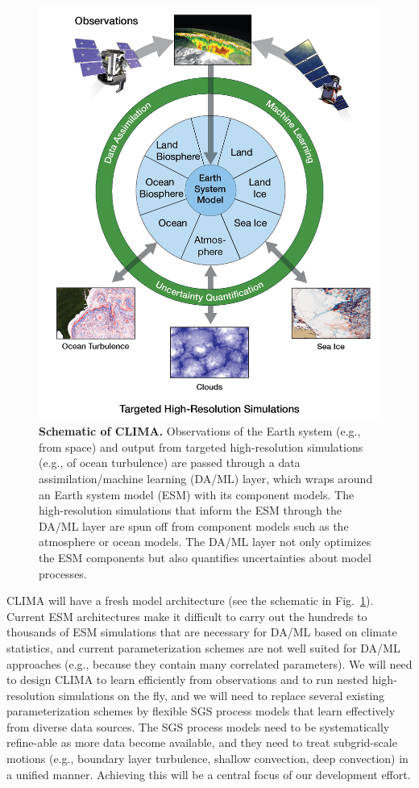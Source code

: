 \documentclass{article}
\begin{document}
\begin{figure}
\centerline{\includegraphics[width=.95\textwidth]{CLIMA-schematic.png}}
\caption{\textbf{Schematic of CLIMA.} Observations of the Earth system (e.g., from space) and output from targeted high-resolution simulations (e.g., of ocean turbulence) are passed through a data assimilation/machine learning (DA/ML) layer, which wraps around an Earth system model (ESM) with its component models. The high-resolution simulations that inform the ESM through the DA/ML layer are spun off from component models such as the atmosphere or ocean models. The DA/ML layer not only optimizes the ESM components but also quantifies uncertainties about model processes.} 
\label{f:CLIMA-schematic}
\end{figure}
CLIMA will have a fresh model architecture (see the schematic in Fig.~\ref{f:CLIMA-schematic}). Current ESM architectures make it difficult to carry out the hundreds to thousands of ESM simulations that are necessary for DA/ML based on climate statistics, and current parameterization schemes are not well suited for DA/ML approaches (e.g., because they contain many correlated parameters).  We will need to design CLIMA to learn efficiently from observations and to run nested high-resolution simulations on the fly, and we will need to replace several existing parameterization schemes by flexible SGS process models that learn effectively from diverse data sources. The SGS process models need to be systematically refine-able as more data become available, and they need to treat subgrid-scale motions (e.g., boundary layer turbulence, shallow convection, deep convection) in a unified manner. Achieving this will be a central focus of our development effort.
\end{document}
